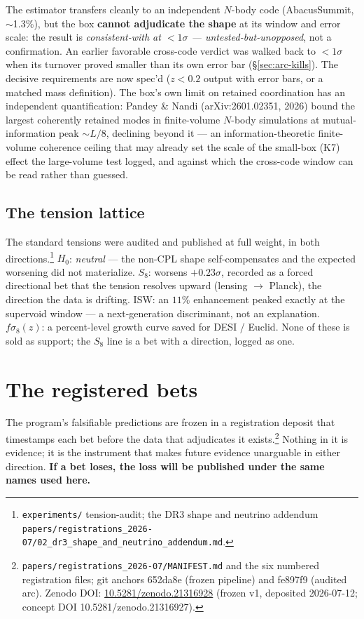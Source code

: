 \documentclass[11pt,a4paper]{article}
\begin{document}
The estimator transfers cleanly to an independent $N$-body code (AbacusSummit, $\sim$1.3\%), but the box \textbf{cannot adjudicate the shape} at its window and error scale: the result is \emph{consistent-with at $<1\sigma$ --- untested-but-unopposed}, not a confirmation. An earlier favorable cross-code verdict was walked back to $<1\sigma$ when its turnover proved smaller than its own error bar (\S\ref{sec:arc-kills}). The decisive requirements are now spec'd ($z < 0.2$ output with error bars, or a matched mass definition). The box's own limit on retained coordination has an independent quantification: Pandey \& Nandi (arXiv:2601.02351, 2026) bound the largest coherently retained modes in finite-volume $N$-body simulations at mutual-information peak $\sim L/8$, declining beyond it --- an information-theoretic finite-volume coherence ceiling that may already set the scale of the small-box (K7) effect the large-volume test logged, and against which the cross-code window can be read rather than guessed.

\subsection*{The tension lattice}

The standard tensions were audited and published at full weight, in both directions.\footnote{\texttt{experiments/} tension-audit; the DR3 shape and neutrino addendum \texttt{papers/registrations\_2026-07/02\_dr3\_shape\_and\_neutrino\_addendum.md}.} $H_0$: \emph{neutral} --- the non-CPL shape self-compensates and the expected worsening did not materialize. $S_8$: worsens $+0.23\sigma$, recorded as a forced directional bet that the tension resolves upward (lensing $\to$ Planck), the direction the data is drifting. ISW: an $11\%$ enhancement peaked exactly at the supervoid window --- a next-generation discriminant, not an explanation. $f\sigma_8(z)$: a percent-level growth curve saved for DESI / Euclid. None of these is sold as support; the $S_8$ line is a bet with a direction, logged as one.

\section{The registered bets}\label{sec:registered-bets}

The program's falsifiable predictions are frozen in a registration deposit that timestamps each bet before the data that adjudicates it exists.\footnote{\texttt{papers/registrations\_2026-07/MANIFEST.md} and the six numbered registration files; git anchors 652da8e (frozen pipeline) and fe897f9 (audited arc). Zenodo DOI: \href{https://doi.org/10.5281/zenodo.21316928}{10.5281/zenodo.21316928} (frozen v1, deposited 2026-07-12; concept DOI 10.5281/zenodo.21316927).} Nothing in it is evidence; it is the instrument that makes future evidence unarguable in either direction. \textbf{If a bet loses, the loss will be published under the same names used here.}
\end{document}
